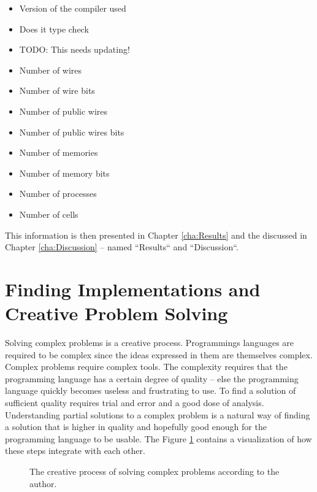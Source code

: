 \begin{itemize}
    \setlength\itemsep{0.5em}
    \item Version of the compiler used
    \item Does it type check
    \item TODO: This needs updating!
    \item Number of wires
    \item Number of wire bits
    \item Number of public wires
    \item Number of public wires bits
    \item Number of memories
    \item Number of memory bits
    \item Number of processes
    \item Number of cells
\end{itemize}
This information is then presented in Chapter \ref{cha:Results} and the discussed in Chapter \ref{cha:Discussion} -- named ``Results`` and ``Discussion``.

\section{Finding Implementations and Creative Problem Solving}
Solving complex problems is a creative process. Programmings languages are required to be complex since the ideas expressed in them are themselves complex. Complex problems require complex tools. The complexity requires that the programming language
has a certain degree of quality -- else the programming language quickly becomes useless and frustrating to use. To find a solution of sufficient quality requires trial and error and a good dose of analysis. Understanding partial solutions to a complex problem is a natural way of finding a solution that is higher in quality and hopefully good enough for the programming language to be usable. The Figure \ref{figCreativeProcess} contains a visualization of how these steps integrate with each other.

\begin{center}
\begin{figure}[h!]
\centering
{}
\caption{The creative process of solving complex problems according to the author.}
\label{figCreativeProcess}
\end{figure}
\end{center}


